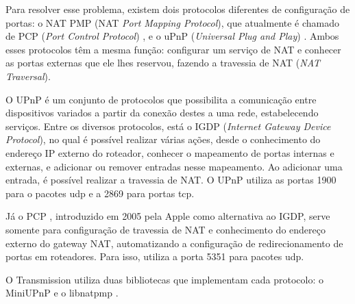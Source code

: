 Para resolver esse problema, existem dois protocolos diferentes de configuração de
portas: o NAT PMP (NAT \emph{Port Mapping Protocol}), que atualmente é chamado de PCP
(\emph{Port Control Protocol}) \cite{site:rfcpcp}, e o uPnP
(\emph{Universal Plug and Play}) \cite{site:rfcupnp}. Ambos esses protocolos têm a mesma
função: configurar um serviço de NAT e conhecer as portas externas que ele lhes
reservou, fazendo a travessia de NAT (\emph{NAT Traversal}).

O UPnP \cite{wiki:upnp} é um conjunto de protocolos que possibilita a comunicação entre
dispositivos variados a partir da conexão destes a uma rede, estabelecendo serviços.
Entre os diversos protocolos, está o IGDP (\emph{Internet Gateway Device Protocol}), no
qual é possível realizar várias ações, desde o conhecimento do endereço IP externo do
roteador, conhecer o mapeamento de portas internas e externas, e adicionar ou remover
entradas nesse mapeamento. Ao adicionar uma entrada, é possível realizar a travessia de
NAT. O UPnP utiliza as portas 1900 para o pacotes \gls*{udp} e a 2869 para portas
\gls*{tcp}.

Já o PCP \cite{wiki:pcp}, introduzido em 2005 pela Apple como alternativa ao IGDP,
serve somente para configuração de travessia de NAT e conhecimento do endereço externo
do gateway NAT, automatizando a configuração de redirecionamento de portas em
roteadores. Para isso, utiliza a porta 5351 para pacotes \gls*{udp}.

O Transmission utiliza duas bibliotecas que implementam cada protocolo: o MiniUPnP
\cite{site:miniupnp} e o libnatpmp \cite{site:libnatpmp}.